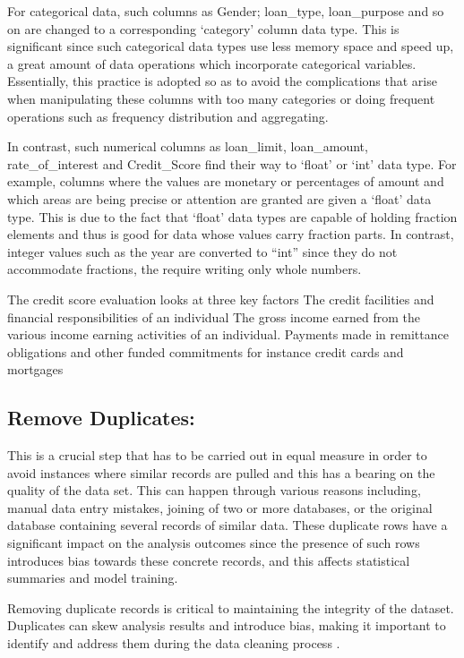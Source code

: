 \documentclass[12pt, a4paper,oneside]{book}
\numberwithin{equation}{section}
\begin{document}
For categorical data, such columns as Gender; loan\_type, loan\_purpose and so on are changed to a corresponding ‘category’ column data type. This is significant since such categorical data types use less memory space and speed up, a great amount of data operations which incorporate categorical variables. Essentially, this practice is adopted so as to avoid the complications that arise when manipulating these columns with too many categories or doing frequent operations such as frequency distribution and aggregating.

In contrast, such numerical columns as loan\_limit, loan\_amount, rate\_of\_interest and Credit\_Score find their way to ‘float’ or ‘int’ data type. For example, columns where the values are monetary or percentages of amount and which areas are being precise or attention are granted are given a ‘float’ data type. This is due to the fact that ‘float’ data types are capable of holding fraction elements and thus is good for data whose values carry fraction parts. In contrast, integer values such as the year are converted to “int” since they do not accommodate fractions, the require writing only whole numbers. 

The credit score evaluation looks at three key factors The credit facilities and financial responsibilities of an individual The gross income earned from the various income earning activities of an individual. Payments made in remittance obligations and other funded commitments for instance credit cards and mortgages

\subsection{Remove Duplicates:} 

This is a crucial step that has to be carried out in equal measure in order to avoid instances where similar records are pulled and this has a bearing on the quality of the data set. This can happen through various reasons including, manual data entry mistakes, joining of two or more databases, or the original database containing several records of similar data. These duplicate rows have a significant impact on the analysis outcomes since the presence of such rows introduces bias towards these concrete records, and this affects statistical summaries and model training. 

Removing duplicate records is critical to maintaining the integrity of the dataset. Duplicates can skew analysis results and introduce bias, making it important to identify and address them during the data cleaning process \cite{boehmke2019hands}.
\end{document}
